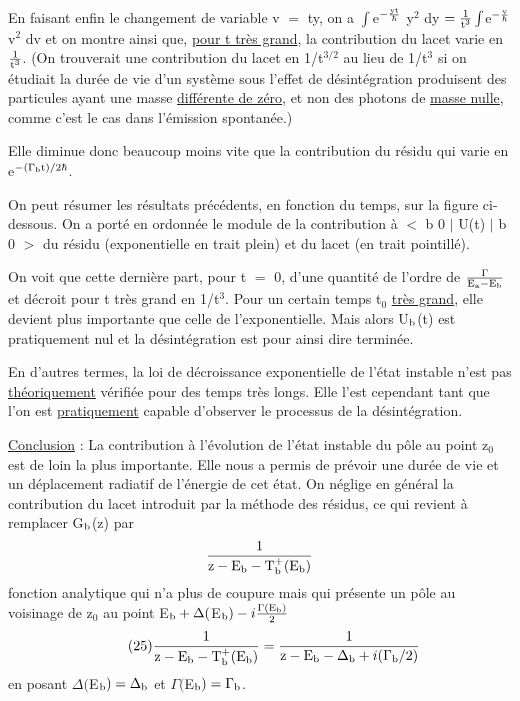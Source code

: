 En faisant enfin le changement de variable v $=$ ty, on a
$\int$e$^{-\frac{\text{yt}}{\hbar}}$ y$^2$ dy $=\frac{1}{\text{t}^3}\int$e$^{-\frac{\text{v}}{\hbar}}$ v$^2$ dv
et on montre ainsi que, \ul{pour t très grand},
la contribution du lacet varie en $\frac{1}{\text{t}^3}$.
{\footnotesize (On trouverait une contribution du lacet en 1/t$^{3/2}$ au lieu de 1/t$^{3}$ si on étudiait
la durée de vie d'un système sous l'effet de désintégration produisent des particules ayant
une masse \ul{différente de zéro}, et non des photons de \ul{masse nulle}, comme
c'est le cas dans l'émission spontanée.)}

Elle diminue donc beaucoup moins vite que la contribution du
résidu qui varie en e$^{-(\Gamma_{\text{b}}\text{t})/2\hbar}$.

On peut résumer les résultats précédents, en fonction du temps,
sur la figure ci-dessous. On a porté en ordonnée le module de la contribution
à $<$ b 0 $|$ U(t) $|$ b 0 $>$ du résidu (exponentielle en trait plein) et du lacet
(en trait pointillé).

\begin{center}
 \end{center}

On voit que cette dernière part, pour t $=$ 0, d'une quantité
de l'ordre de $\frac{\Gamma}{\text{E}_{\text{a}}-\text{E}_{\text{b}}}$
et décroit pour t très grand en 1/t$^3$. Pour un certain
temps t$_0$ \ul{très grand}, elle devient plus importante que celle de l'exponentielle.
Mais alors U$_{\text{b}}$(t) est pratiquement nul et la désintégration est pour ainsi dire
terminée.

En d'autres termes, la loi de décroissance exponentielle de
l'état instable n'est pas \ul{théoriquement} vérifiée pour des temps très longs.
Elle l'est cependant tant que l'on est \ul{pratiquement} capable d'observer le processus de la désintégration.

\ul{Conclusion} : La contribution à l'évolution de l'état instable du pôle au point
z$_0$ est de loin la plus importante. Elle nous a permis de prévoir une durée de
vie et un déplacement radiatif de l'énergie de cet état. On néglige en général
la contribution du lacet introduit par la méthode des résidus, ce qui revient
à remplacer G$_{\text{b}}$(z) par
\[
\frac{1}{\text{z}-\text{E}_{\text{b}}-\text{T}^+_{\text{b}}(\text{E}_{\text{b}})}
\]
fonction analytique qui n'a plus de coupure mais qui présente un pôle au voisinage de z$_0$ au point
E$_{\text{b}}+\Delta($E$_{\text{b}})-i\frac{\Gamma(\text{E}_{\text{b}})}{2}$
\[
\tag{25}\frac{1}{\text{z}-\text{E}_{\text{b}}-\text{T}^+_{\text{b}}(\text{E}_{\text{b}})}=
\frac{1}{\text{z}-\text{E}_{\text{b}}-\Delta_{\text{b}}+i(\Gamma_{\text{b}}/2)}
\]
en posant $\Delta($E$_{\text{b}})=\Delta_{\text{b}}$ et $\Gamma($E$_{\text{b}})=\Gamma_{\text{b}}$.

